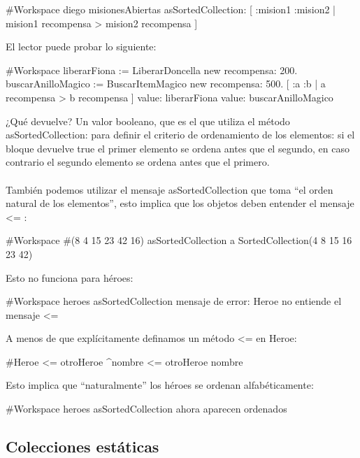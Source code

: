 \documentclass[a4paper,12pt]{book}
\begin{document}
\begin{code}
#Workspace
diego misionesAbiertas asSortedCollection: 
    [ :mision1 :mision2 | mision1 recompensa > mision2 recompensa ]
\end{code}

El lector puede probar lo siguiente:

\begin{code}
#Workspace
liberarFiona := LiberarDoncella new recompensa: 200.
buscarAnilloMagico := BuscarItemMagico new recompensa: 500.
[ :a :b | a recompensa > b recompensa ] 
     value: liberarFiona value: buscarAnilloMagico
\end{code}

¿Qué devuelve? Un valor booleano, que es el que utiliza el método asSortedCollection: para definir el criterio
de ordenamiento de los elementos: si el bloque devuelve true el primer elemento se ordena antes que el segundo,
en caso contrario el segundo elemento se ordena antes que el primero.
\\
\\
También podemos utilizar el mensaje asSortedCollection que toma ``el orden natural de los elementos'',
esto implica que los objetos deben entender el mensaje \textless= :

\begin{code}
#Workspace
#(8 4 15 23 42 16) asSortedCollection 
  a SortedCollection(4 8 15 16 23 42)
\end{code}

Esto no funciona para héroes:

\begin{code}
#Workspace
heroes asSortedCollection
  {mensaje de error: Heroe no entiende el mensaje <=}
\end{code}

A menos de que explícitamente definamos un método \textless= en Heroe:

\begin{code}
#Heroe
<= otroHeroe
   ^nombre <= otroHeroe nombre
\end{code}

Esto implica que ``naturalmente'' los héroes se ordenan alfabéticamente:

\begin{code}
#Workspace
heroes asSortedCollection
  {ahora aparecen ordenados}
\end{code}


\subsection{Colecciones estáticas}
\end{document}
